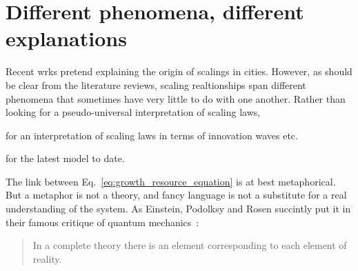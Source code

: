 \section{Different phenomena, different explanations}
\label{sec:different_phenomena_different_explanations}
    
Recent wrks pretend explaining the origin of scalings in cities. However,
as should be clear from the literature reviews, scaling realtionships span
different phenomena that sometimes have very little to do with one another.
Rather than looking for a pseudo-universal interpretation of scaling laws, 

\cite{Pumain:2006} for an interpretation of scaling laws in terms of
innovation waves etc.

\cite{Bettencourt:2013} for the latest model to date.

The link between Eq.~\ref{eq:growth_resource_equation} is at best metaphorical.
But a metaphor is not a theory, and fancy language is not a substitute for a
real understanding of the system. As Einstein, Podolksy and Rosen succintly put
it in their famous critique of quantum mechanics~\cite{Einstein:1935}:

\begin{quote}
    In a complete theory there is an element corresponding to each element of
    reality.
\end{quote}

